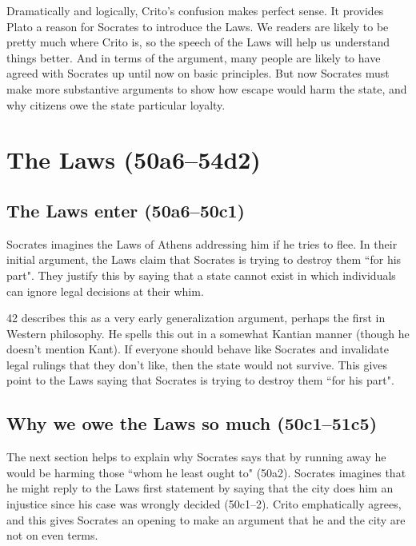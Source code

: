 \documentclass[12pt,letterpaper]{article}
\begin{document}
Dramatically and logically, Crito's confusion makes perfect sense. It
provides Plato a reason for Socrates to introduce the Laws. We readers are
likely to be pretty much where Crito is, so the speech of the Laws will
help us understand things better. And in terms of the argument, many
people are likely to have agreed with Socrates up until now on basic
principles. But now Socrates must make more substantive arguments to show
how escape would harm the state, and why citizens owe the state particular
loyalty.



\section*{The Laws (50a6--54d2)}

\subsection*{The Laws enter (50a6--50c1)}

Socrates imagines the Laws of Athens addressing him if he tries to flee. In their initial argument, the Laws claim that Socrates is trying to destroy them ``for his part". They justify this by saying that a state cannot exist in which individuals can ignore legal decisions at their whim.

\cite{kraut1984} 42 describes this as a very early generalization argument, perhaps the first in Western philosophy. He spells this out in a somewhat Kantian manner (though he doesn't mention Kant). If everyone should behave like Socrates and invalidate legal rulings that they don't like, then the state would not survive. This gives point to the Laws saying that Socrates is trying to destroy them ``for his part".

\subsection*{Why we owe the Laws so much (50c1--51c5)}

The next section helps to explain why Socrates says that by running away he would be harming those ``whom he least ought to" (50a2). Socrates imagines that he might reply to the Laws first statement by saying that the city does him an injustice since his case was wrongly decided (50c1--2). Crito emphatically agrees, and this gives Socrates an opening to make an argument that he and the city are not on even terms.
\end{document}
